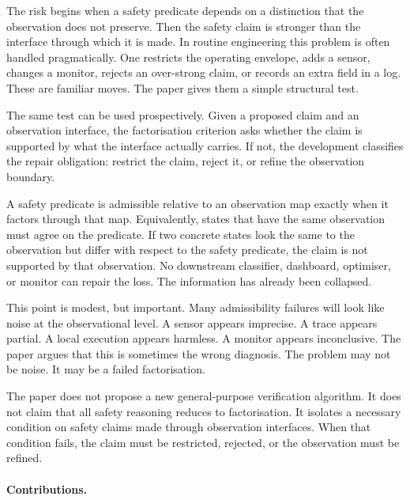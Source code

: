 \documentclass[a4paper,11pt]{article}
\begin{document}
The risk begins when a safety predicate depends on a distinction that the
observation does not preserve. Then the safety claim is stronger than the
interface through which it is made. In routine engineering this problem is often
handled pragmatically. One restricts the operating envelope, adds a sensor,
changes a monitor, rejects an over-strong claim, or records an extra field in a
log. These are familiar moves. The paper gives them a simple structural test.

The same test can be used prospectively.  Given a proposed claim and an
observation interface, the factorisation criterion asks whether the claim is
supported by what the interface actually carries.  If not, the development
classifies the repair obligation: restrict the claim, reject it, or refine the
observation boundary.

A safety predicate is admissible relative to an observation map exactly when it
factors through that map. Equivalently, states that have the same observation
must agree on the predicate. If two concrete states look the same to the
observation but differ with respect to the safety predicate, the claim is not
supported by that observation. No downstream classifier, dashboard, optimiser,
or monitor can repair the loss. The information has already been collapsed.

This point is modest, but important. Many admissibility failures will look like
noise at the observational level. A sensor appears imprecise. A trace appears
partial. A local execution appears harmless. A monitor appears inconclusive. The
paper argues that this is sometimes the wrong diagnosis. The problem may not be
noise. It may be a failed factorisation.

The paper does not propose a new general-purpose verification algorithm. It
does not claim that all safety reasoning reduces to factorisation. It isolates a
necessary condition on safety claims made through observation interfaces. When
that condition fails, the claim must be restricted, rejected, or the observation
must be refined.

\paragraph{Contributions.}
\end{document}
